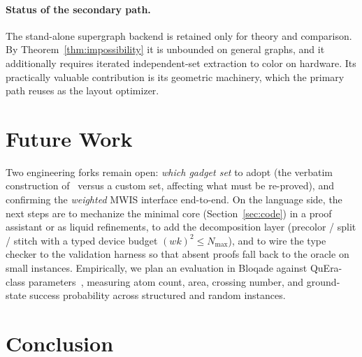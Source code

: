 \documentclass[11pt]{article}
\theoremstyle{definition}
\theoremstyle{remark}
\newcommand{\Nmax}{N_{\max}}
\begin{document}
\paragraph{Status of the secondary path.} The stand-alone supergraph backend is retained
only for theory and comparison. By Theorem~\ref{thm:impossibility} it is unbounded on
general graphs, and it additionally requires iterated independent-set extraction to color
on hardware. Its practically valuable contribution is its geometric machinery, which the
primary path reuses as the layout optimizer.

\section{Future Work}
\label{sec:future}

Two engineering forks remain open: \emph{which gadget set} to adopt (the verbatim
construction of~\cite{Nguyen2023} versus a custom set, affecting what must be re-proved),
and confirming the \emph{weighted} MWIS interface end-to-end. On the language side, the
next steps are to mechanize the minimal core (Section~\ref{sec:code}) in a proof
assistant or as liquid refinements, to add the decomposition layer (precolor / split /
stitch with a typed device budget $(wk)^2\le\Nmax$), and to wire the type checker to the
validation harness so that absent proofs fall back to the oracle on small instances.
Empirically, we plan an evaluation in Bloqade against QuEra-class
parameters~\cite{Wurtz2023}, measuring atom count, area, crossing number, and
ground-state success probability across structured and random instances.

\section{Conclusion}
\label{sec:conclusion}
\end{document}
